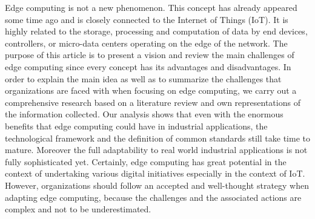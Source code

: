 Edge computing is not a new phenomenon. This concept has already appeared some time ago and is closely connected to the Internet of Things (IoT). It is highly related to the storage, processing and computation of data by end devices, controllers, or micro-data centers operating on the edge of the network. The purpose of this article is to present a vision and review the main challenges of edge computing since every concept has its advantages and disadvantages. In order to explain the main idea as well as to summarize the challenges that organizations are faced with when focusing on edge computing, we carry out a comprehensive research based on a literature review and own representations of the information collected. Our analysis shows that even with the enormous benefits that edge computing could have in industrial applications, the technological framework and the definition of common standards still take time to mature. Moreover the full adaptability to real world industrial applications is not fully sophisticated yet. Certainly, edge computing has great potential in the context of undertaking various digital initiatives especially in the context of IoT. However, organizations should follow an accepted and well-thought strategy when adapting edge computing, because the challenges and the associated actions are complex and not to be underestimated.